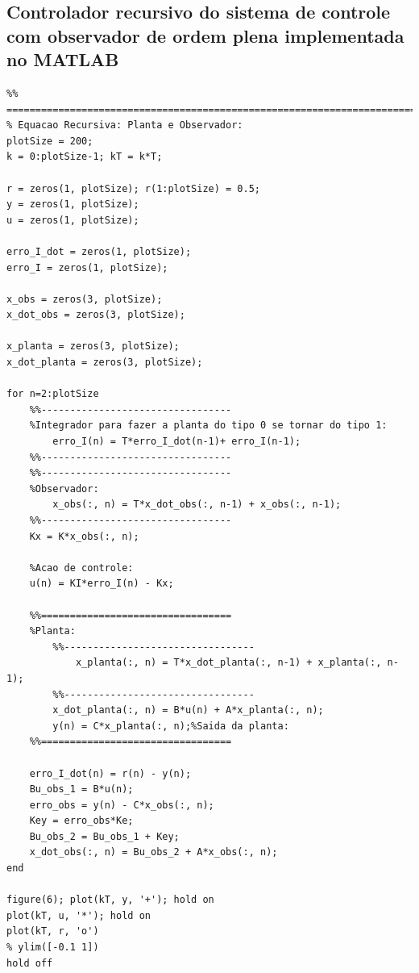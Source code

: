 \documentclass[
	article,			%
	11pt,				%
	oneside,			%
	a4paper,			%
	english,			%
	brazil,				%
	sumario=tradicional
	]{abntex2}
\begin{document}
\begin{apendicesenv}
	
	\partapendices

\chapter{Controlador recursivo do sistema de controle com observador de ordem plena implementada no MATLAB}
	\label{app:implementacaoRecursivaMATLAB}
	
	\lstset{language=MATLAB}
	\begin{lstlisting}
%% ========================================================================
% Equacao Recursiva: Planta e Observador:
plotSize = 200;
k = 0:plotSize-1; kT = k*T;

r = zeros(1, plotSize); r(1:plotSize) = 0.5;
y = zeros(1, plotSize);
u = zeros(1, plotSize);

erro_I_dot = zeros(1, plotSize);
erro_I = zeros(1, plotSize);

x_obs = zeros(3, plotSize);
x_dot_obs = zeros(3, plotSize);

x_planta = zeros(3, plotSize);
x_dot_planta = zeros(3, plotSize);

for n=2:plotSize
    %%---------------------------------
    %Integrador para fazer a planta do tipo 0 se tornar do tipo 1:
        erro_I(n) = T*erro_I_dot(n-1)+ erro_I(n-1);
    %%---------------------------------
    %%---------------------------------
    %Observador:
        x_obs(:, n) = T*x_dot_obs(:, n-1) + x_obs(:, n-1);
    %%---------------------------------
    Kx = K*x_obs(:, n);
    
    %Acao de controle:
    u(n) = KI*erro_I(n) - Kx;
    
    %%=================================
    %Planta:
        %%---------------------------------
            x_planta(:, n) = T*x_dot_planta(:, n-1) + x_planta(:, n-1);
        %%---------------------------------
        x_dot_planta(:, n) = B*u(n) + A*x_planta(:, n);
        y(n) = C*x_planta(:, n);%Saida da planta:
    %%=================================
    
    erro_I_dot(n) = r(n) - y(n);
    Bu_obs_1 = B*u(n);
    erro_obs = y(n) - C*x_obs(:, n);
    Key = erro_obs*Ke;
    Bu_obs_2 = Bu_obs_1 + Key;
    x_dot_obs(:, n) = Bu_obs_2 + A*x_obs(:, n);
end

figure(6); plot(kT, y, '+'); hold on
plot(kT, u, '*'); hold on
plot(kT, r, 'o') 
% ylim([-0.1 1])
hold off
	\end{lstlisting}
	\pagebreak


\end{apendicesenv}
\end{document}
